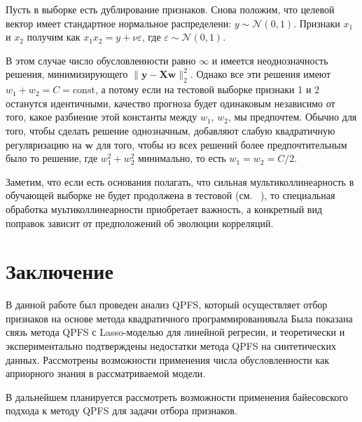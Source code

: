 \documentclass[12pt, twoside]{article}
\newcommand{\by}{\mathbf{y}}
\newcommand{\bw}{\mathbf{w}}
\newcommand{\bX}{\mathbf{X}}
\newcommand{\cN}{\mathcal{N}}
\begin{document}
Пусть в выборке есть дублирование признаков. Снова положим, что целевой вектор имеет стандартное нормальное распределени: $y \sim \cN(0, 1)$. Признаки $x_1$ и $x_2$ получим как $x_1 x_2 = y + \nu \varepsilon$, где $\varepsilon \sim \cN(0, 1)$.

В этом случае число обусловленности равно $\infty$ и имеется неоднозначность решения, минимизирующего $\|\by - \bX \bw\|_2^2$. Однако все эти решения имеют $w_1 + w_2 = C = \mathrm{const}$, а потому если на тестовой выборке признаки 1 и 2 останутся идентичными, качество прогноза будет одинаковым независимо от того, какое разбиение этой константы между $w_1$, $w_2$, мы предпочтем. Обычно для того, чтобы сделать решение однозначным, добавляют слабую квадратичную регуляризацию на $\bw$ для того, чтобы из всех решений более предпочтительным было то решение, где $w_1^2 + w_2^2$ минимально, то есть $w_1 = w_2 = C / 2$. 

Заметим, что если есть основания полагать, что сильная мультиколлинеарность в обучающей выборке не будет продолжена в тестовой (см. ~\cite{multicollinearity_need_no_continuation}), то специальная обработка муьтиколлинеарности приобретает важность, а конкретный вид поправок зависит от предположений об эволюции корреляций.


\section{Заключение}
В данной работе был проведен анализ QPFS, который осуществляет отбор признаков на основе метода квадратичного программированияыла Была показана связь метода QPFS с Lasso-моделью для линейной регресии, и теоретически и экспериментально подтверждены недостатки метода QPFS на синтетических данных. Рассмотрены возможности применения числа обусловленности как априорного знания в рассматриваемой модели.

В дальнейшем планируется рассмотреть возможности применения байесовского подхода к методу QPFS для задачи отбора признаков.



\nocite{*}
\end{document}

